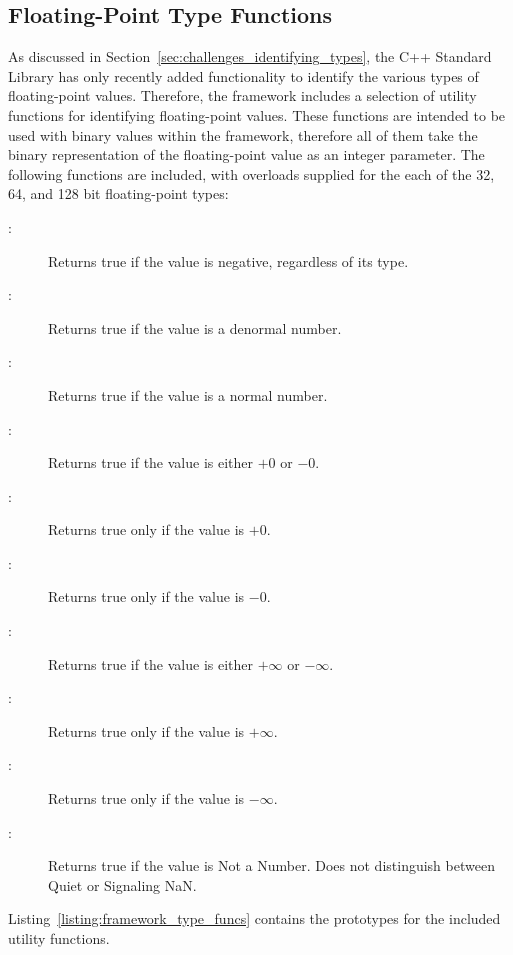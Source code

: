 \subsection{Floating-Point Type Functions}
As discussed in Section~\ref{sec:challenges_identifying_types}, the C++ Standard Library has only recently added functionality to identify the various types of floating-point values. Therefore, the framework includes a selection of utility functions for identifying floating-point values. These functions are intended to be used with binary values within the framework, therefore all of them take the binary representation of the floating-point value as an integer parameter. The following functions are included, with overloads supplied for the each of the 32, 64, and 128 bit floating-point types:

\begin{description}
  \item[ :] Returns true if the value is negative, regardless of its type.
  \item[ :] Returns true if the value is a denormal number.
  \item[ :] Returns true if the value is a normal number.
  \item[ :] Returns true if the value is either $+0$ or $-0$.
  \item[ :] Returns true only if the value is $+0$.
  \item[ :] Returns true only if the value is $-0$.
  \item[ :] Returns true if the value is either $+\infty$ or $-\infty$.
  \item[ :] Returns true only if the value is $+\infty$.
  \item[ :] Returns true only if the value is $-\infty$.
  \item[ :] Returns true if the value is Not a Number. Does not distinguish between Quiet or Signaling NaN.
\end{description}

Listing~\ref{listing:framework_type_funcs} contains the prototypes for the included utility functions.

